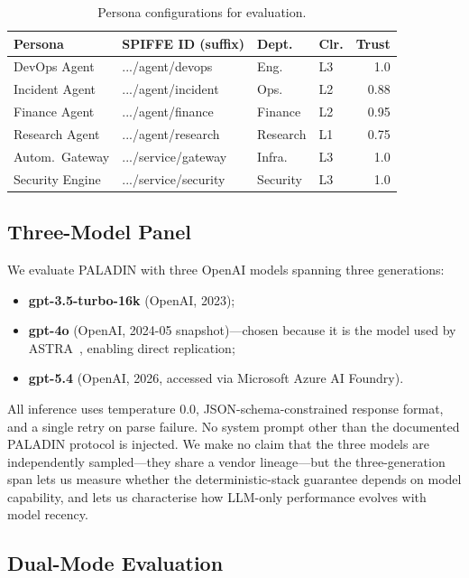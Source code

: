\documentclass[10pt,a4paper,twocolumn]{article}
\begin{document}
\begin{table}[!t]
\centering
\caption{Persona configurations for evaluation.}
\label{tab:personas}
\scriptsize
\setlength{\tabcolsep}{2.5pt}
\begin{tabular}{@{}llllr@{}}
\toprule
\textbf{Persona} & \textbf{SPIFFE ID (suffix)} & \textbf{Dept.} & \textbf{Clr.} & \textbf{Trust} \\
\midrule
DevOps Agent & .../agent/devops & Eng. & L3 & 1.0 \\
Incident Agent & .../agent/incident & Ops. & L2 & 0.88 \\
Finance Agent & .../agent/finance & Finance & L2 & 0.95 \\
Research Agent & .../agent/research & Research & L1 & 0.75 \\
Autom.\ Gateway & .../service/gateway & Infra. & L3 & 1.0 \\
Security Engine & .../service/security & Security & L3 & 1.0 \\
\bottomrule
\end{tabular}
\end{table}

\subsection{Three-Model Panel}
\label{sec:model_panel}

We evaluate PALADIN with three OpenAI models spanning three generations:
\begin{itemize}
  \item \textbf{gpt-3.5-turbo-16k} (OpenAI, 2023);
  \item \textbf{gpt-4o} (OpenAI, 2024-05 snapshot)---chosen because it is the model used by ASTRA~\cite{elhelou2025astra}, enabling direct replication;
  \item \textbf{gpt-5.4} (OpenAI, 2026, accessed via Microsoft Azure AI Foundry).
\end{itemize}

All inference uses temperature $0.0$, JSON-schema-constrained response format, and a single retry on parse failure. No system prompt other than the documented PALADIN protocol is injected. We make no claim that the three models are independently sampled---they share a vendor lineage---but the three-generation span lets us measure whether the deterministic-stack guarantee depends on model capability, and lets us characterise how LLM-only performance evolves with model recency.

\subsection{Dual-Mode Evaluation}
\label{sec:dual_mode}
\end{document}
